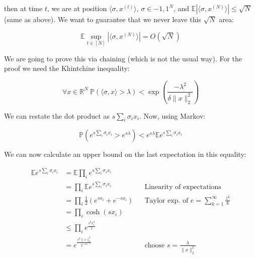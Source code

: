 \documentclass[11pt]{article}
\begin{document}
then at time $t$, we are at position $\langle\sigma, x^{(t)}\rangle$, $\sigma \in {-1,1}^N$, and $\mathbb{E}|\langle\sigma, x^{(N)}\rangle| \leq \sqrt{N}$ (same as above). We want to guarantee that we never leave this $\sqrt{N}$ area:

\begin{equation*}
\mathbb{E}\sup_{t \in [N]}|\langle\sigma, x^{(N)}\rangle| = O(\sqrt{N})
\end{equation*}

 \par

We are going to prove this via chaining (which is not the usual way). For the proof we need the Khintchine inequality:

\begin{equation*}
\forall x \in \mathbb{R}^N\ \mathbb{P}(\langle \sigma, x \rangle > \lambda) < \exp(\frac{-\lambda^2}{\delta \lVert x \rVert_2^2})
\end{equation*}

We can restate the dot product as $s \sum_i \sigma_i x_i$. Now, using Markov:

\begin{equation*}
\mathbb{P}(e^{s \sum_i \sigma_i x_i} > e^{s\lambda}) < e^{s\lambda} \mathbb{E}e^{s \sum_i \sigma_i x_i}
\end{equation*}

We can now calculate an upper bound on the last expectation in this equality: 

\begin{align*}
\mathbb{E}e^{s \sum_i \sigma_i x_i} &= \mathbb{E}\prod_i e^{s \sum_i \sigma_i x_i} && {} \\
                                 {} &= \prod_i\mathbb{E} e^{s \sum_i \sigma_i x_i} && \text{Linearity of expectations} \\
                                 {} &= \prod_i \frac{1}{2} (e^{s x_i} + e^{-s x_i}) && \text{Taylor exp. of } e = \sum_{k=1}^\infty \frac{z^k}{k} \\
                                 {} &= \prod_i \cosh(sx_i) \\
                                 {} &\leq \prod_i e^{\frac{s^2x_i^2}{2}} \\
                                 {} &= e^{\frac{s^2\lVert x\rVert _2^2}{2^{-s\lambda}}} && \text{choose } s = \frac{\lambda}{\lVert x \rVert _2^2}
\end{align*}
\end{document}
